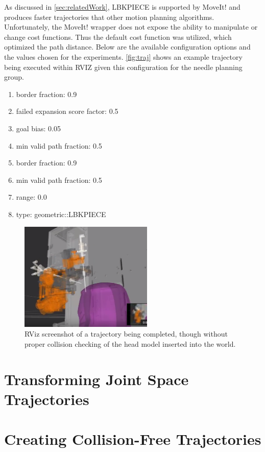 \documentclass[12pt]{report}
\begin{document}
As discussed in \autoref{sec:relatedWork}, LBKPIECE is supported by MoveIt! and produces faster trajectories that other motion planning algorithms. Unfortunately, the MoveIt! wrapper does not expose the ability to manipulate or change cost functions. Thus the default cost function was utilized, which optimized the path distance. Below are the available configuration options and the values chosen for the experiments. \autoref{fig:traj} shows an example trajectory being executed within RVIZ given this configuration for the needle planning group.

\begin{enumerate}
\item border fraction: 0.9
\item failed expansion score factor: 0.5
\item goal bias: 0.05
\item min valid path fraction: 0.5
\item border fraction: 0.9
\item min valid path fraction: 0.5
\item range: 0.0
\item type: geometric::LBKPIECE
\end{enumerate}

\begin{figure}[thpb]
	\centering
	\includegraphics[width = 2.5in]{images/traj.png}
    \caption{RViz screenshot of a trajectory being completed, though without proper collision checking of the head model inserted into the world.}
    \label{fig:traj}
\end{figure}
\section{Transforming Joint Space Trajectories}

\section{Creating Collision-Free Trajectories}
\end{document}
